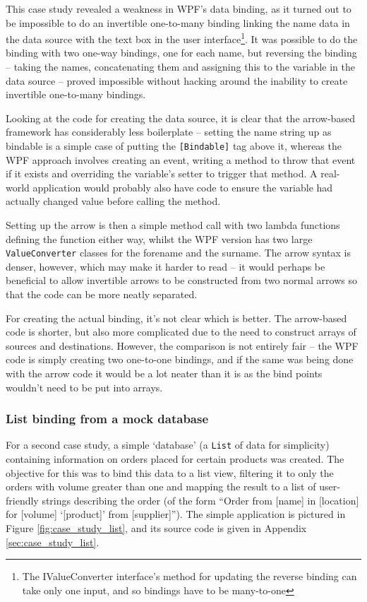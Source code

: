 \documentclass[12pt,twoside,notitlepage]{report}
\begin{document}
This case study revealed a weakness in WPF's data binding, as it turned out to be impossible to do an invertible one-to-many binding linking the name data in the data source with the text box in the user interface\footnote{The IValueConverter interface's method for updating the reverse binding can take only one input, and so bindings have to be many-to-one}. It was possible to do the binding with two one-way bindings, one for each name, but reversing the binding -- taking the names, concatenating them and assigning this to the variable in the data source -- proved impossible without hacking around the inability to create invertible one-to-many bindings.

Looking at the code for creating the data source, it is clear that the arrow-based framework has considerably less boilerplate -- setting the name string up as bindable is a simple case of putting the \texttt{[Bindable]} tag above it, whereas the WPF approach involves creating an event, writing a method to throw that event if it exists and overriding the variable's setter to trigger that method. A real-world application would probably also have code to ensure the variable had actually changed value before calling the method.

Setting up the arrow is then a simple method call with two lambda functions defining the function either way, whilst the WPF version has two large \texttt{ValueConverter} classes for the forename and the surname. The arrow syntax is denser, however, which may make it harder to read -- it would perhaps be beneficial to allow invertible arrows to be constructed from two normal arrows so that the code can be more neatly separated.

For creating the actual binding, it's not clear which is better. The arrow-based code is shorter, but also more complicated due to the need to construct arrays of sources and destinations. However, the comparison is not entirely fair -- the WPF code is simply creating two one-to-one bindings, and if the same was being done with the arrow code it would be a lot neater than it is as the bind points wouldn't need to be put into arrays.

\subsubsection{List binding from a mock database}

For a second case study, a simple `database' (a \texttt{List} of data for simplicity) containing information on orders placed for certain products was created. The objective for this was to bind this data to a list view, filtering it to only the orders with volume greater than one and mapping the result to a list of user-friendly strings describing the order (of the form ``Order from [name] in [location] for [volume] `[product]' from [supplier]''). The simple application is pictured in Figure \ref{fig:case_study_list}, and its source code is given in Appendix \ref{sec:case_study_list}.
\end{document}
